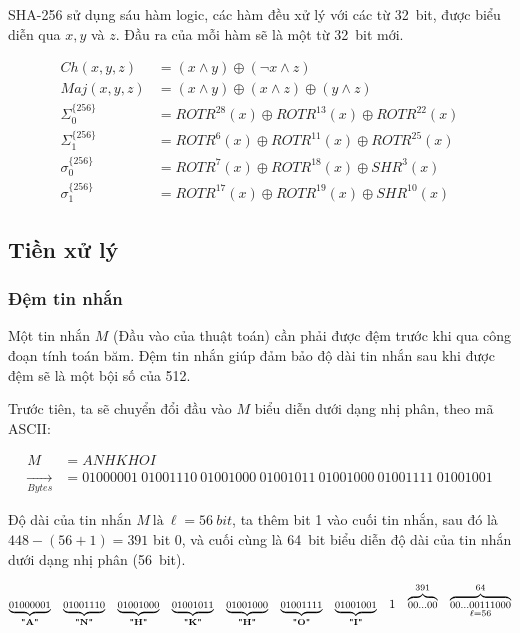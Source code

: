 SHA-256 sử dụng sáu hàm logic, các hàm đều xử lý với các từ 32~bit, được biểu diễn qua $x, y$ và $z$. Đầu ra của mỗi hàm sẽ là một từ 32~bit mới.

\begin{align}
	Ch(x,y,z) &= (x\land y)\oplus(\neg x\land z) \\
	Maj(x,y,z)&= (x\land y)\oplus(x\land z)\oplus(y\land z)\\
	\Sigma_0^{\{256\}} &= ROTR^{28}(x) \oplus ROTR^{13}(x) \oplus ROTR^{22}(x)\\
	\Sigma_1^{\{256\}} &= ROTR^{6}(x) \oplus ROTR^{11}(x) \oplus ROTR^{25}(x)\\
	\sigma_0^{\{256\}} &= ROTR^{7}(x) \oplus ROTR^{18}(x) \oplus SHR^{3}(x)\\
	\sigma_1^{\{256\}} &= ROTR^{17}(x) \oplus ROTR^{19}(x) \oplus SHR^{10}(x)
\end{align}

\subsection{Tiền xử lý}

\subsubsection{Đệm tin nhắn}

Một tin nhắn $M$ (Đầu vào của thuật toán) cần phải được đệm trước khi qua công đoạn tính toán băm. Đệm tin nhắn giúp đảm bảo độ dài tin nhắn sau khi được đệm sẽ là một bội số của 512. 

Trước tiên, ta sẽ chuyển đổi đầu vào $M$ biểu diễn dưới dạng nhị phân, theo mã ASCII:

\begin{align*}
	M &= ANHKHOI \\
	\xrightarrow[Bytes]{} &= 01000001~ 01001110~ 01001000~ 01001011~ 01001000~ 01001111~ 01001001	
\end{align*}

Độ dài của tin nhắn $M ~\text{là}~ \ell = 56~ bit$, ta thêm bit 1 vào cuối tin nhắn, sau đó là $448-(56+1) = 391$ bit 0, và cuối cùng là 64~bit biểu diễn độ dài của tin nhắn dưới dạng nhị phân (56~bit).

\[
\footnotesize
\underbrace{01000001}_{\text{\textbf{"A"}}} \quad
\underbrace{01001110}_{\text{\textbf{"N"}}} \quad
\underbrace{01001000}_{\text{\textbf{"H"}}} \quad
\underbrace{01001011}_{\text{\textbf{"K"}}} \quad
\underbrace{01001000}_{\text{\textbf{"H"}}} \quad
\underbrace{01001111}_{\text{\textbf{"O"}}} \quad
\underbrace{01001001}_{\text{\textbf{"I"}}} \quad
1 \quad
\overbrace{00...00}^{391} \quad
\overbrace{00...00111000}^{64}_{\ell=56}
\]

